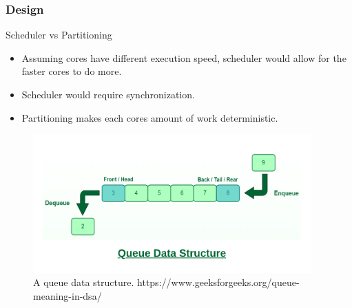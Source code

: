 \begin{frame}[hoved]
	\frametitle{Design}
	\begin{minipage}[t]{0.45\textwidth}
		{\large Scheduler vs Partitioning}
		\begin{itemize}
			\item Assuming cores have different execution speed, scheduler would allow
			      for the faster cores to do more.
			\item Scheduler would require synchronization.
			\item Partitioning makes each cores amount of work deterministic.
		\end{itemize}
	\end{minipage}
	\hfill
	\begin{minipage}[t]{0.45\textwidth}
		\begin{figure}
			\begin{center}
				\includegraphics[width=0.95\textwidth]{figures/queue.png}
			\end{center}
			\caption{A queue data structure. \tiny https://www.geeksforgeeks.org/queue-meaning-in-dsa/}\label{fig:queue}
		\end{figure}
	\end{minipage}
\end{frame}

